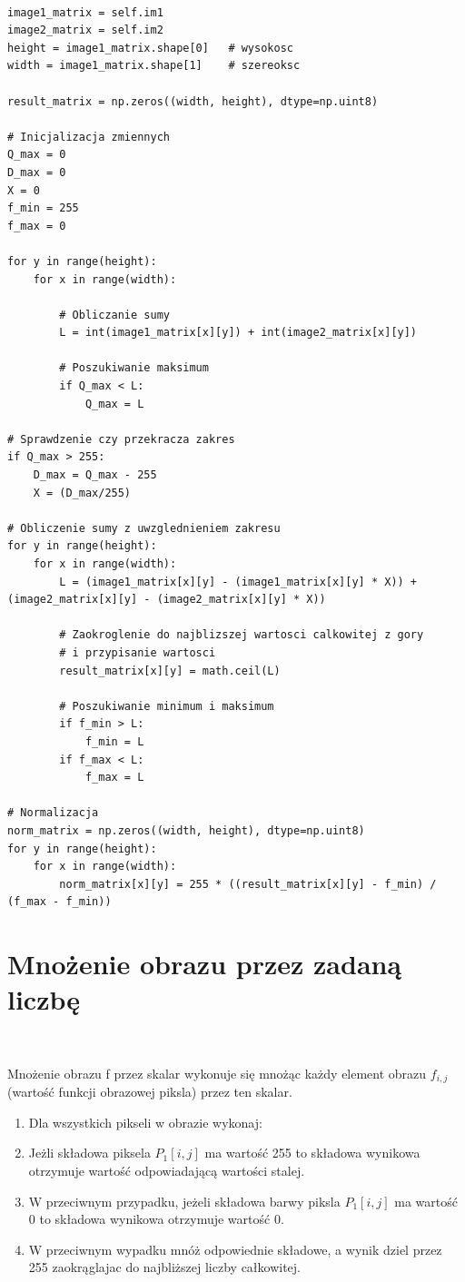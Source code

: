 \documentclass[final,a4paper,openany,12pt]{mwbk}
\begin{document}
\begin{lstlisting}[caption=Sumowanie obrazów szarych]

image1_matrix = self.im1
image2_matrix = self.im2
height = image1_matrix.shape[0]   # wysokosc
width = image1_matrix.shape[1]    # szereoksc

result_matrix = np.zeros((width, height), dtype=np.uint8)

# Inicjalizacja zmiennych
Q_max = 0
D_max = 0
X = 0
f_min = 255
f_max = 0

for y in range(height):
    for x in range(width):  

        # Obliczanie sumy
        L = int(image1_matrix[x][y]) + int(image2_matrix[x][y])

        # Poszukiwanie maksimum
        if Q_max < L:
            Q_max = L

# Sprawdzenie czy przekracza zakres
if Q_max > 255:
    D_max = Q_max - 255
    X = (D_max/255)

# Obliczenie sumy z uwzglednieniem zakresu
for y in range(height):
    for x in range(width): 
        L = (image1_matrix[x][y] - (image1_matrix[x][y] * X)) + (image2_matrix[x][y] - (image2_matrix[x][y] * X))

        # Zaokroglenie do najblizszej wartosci calkowitej z gory
        # i przypisanie wartosci
        result_matrix[x][y] = math.ceil(L)
        
        # Poszukiwanie minimum i maksimum
        if f_min > L:
            f_min = L
        if f_max < L:
            f_max = L

# Normalizacja
norm_matrix = np.zeros((width, height), dtype=np.uint8)
for y in range(height):
    for x in range(width):
        norm_matrix[x][y] = 255 * ((result_matrix[x][y] - f_min) / (f_max - f_min))

\end{lstlisting}

\section {Mnożenie obrazu przez zadaną liczbę}
\hfill\\
\indent

Mnożenie obrazu f przez skalar wykonuje się mnożąc każdy element obrazu $f_{i,j}$ (wartość funkcji obrazowej piksla) przez ten skalar.

\begin{enumerate}
		\item Dla wszystkich pikseli w obrazie wykonaj:
		\item Jeżli składowa piksela $P_{1}[i,j]$ ma wartość 255 to składowa wynikowa otrzymuje wartość odpowiadającą wartości stalej.
		\item W przeciwnym przypadku, jeżeli składowa barwy piksla $P_{1}[i,j]$ ma wartość 0 to składowa wynikowa otrzymuje wartość 0.
		\item W przeciwnym wypadku mnóż odpowiednie składowe, a wynik dziel przez 255 zaokrąglajac do najbliższej liczby całkowitej.
	\end{enumerate}
\end{document}
